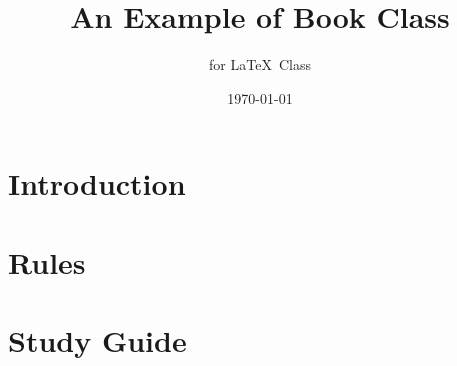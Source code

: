 \documentclass[11pt]{report}              %
\title{\bf An Example of Book Class}    %
\author{for \LaTeX\ Class}              %
\date{\today}                           %
\begin{document}
\maketitle                              %
\tableofcontents                        %
\part{Introduction}                   %

\part{Rules}

\part{Study Guide}

\begin{appendices}

\end{appendices}
\end{document}
